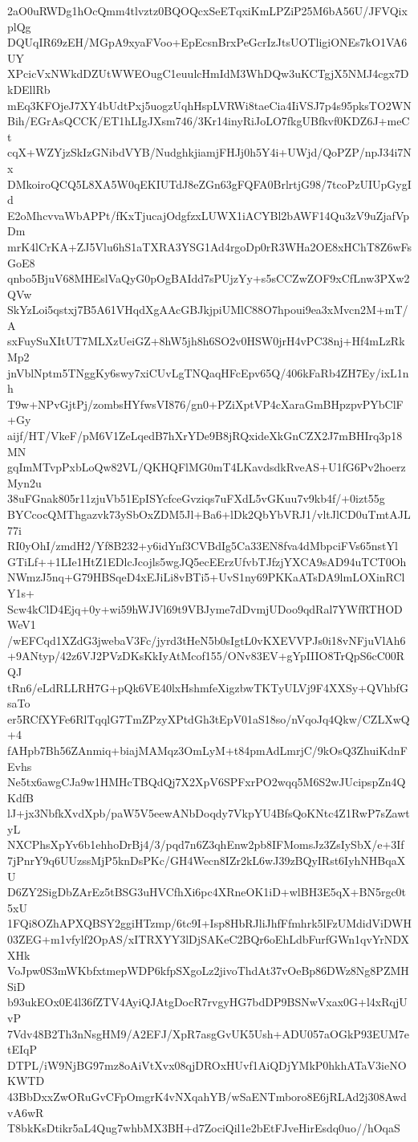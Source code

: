 2aO0uRWDg1hOcQmm4tlvztz0BQOQcxSeETqxiKmLPZiP25M6bA56U/JFVQixplQg
DQUqIR69zEH/MGpA9xyaFVoo+EpEcsnBrxPeGcrIzJtsUOTligiONEs7kO1VA6UY
XPcicVxNWkdDZUtWWEOugC1euulcHmIdM3WhDQw3uKCTgjX5NMJ4cgx7DkDEllRb
mEq3KFOjeJ7XY4bUdtPxj5uogzUqhHspLVRWi8taeCia4IiVSJ7p4s95pksTO2WN
Bih/EGrAsQCCK/ET1hLIgJXsm746/3Kr14inyRiJoLO7fkgUBfkvf0KDZ6J+meCt
cqX+WZYjzSkIzGNibdVYB/NudghkjiamjFHJj0h5Y4i+UWjd/QoPZP/npJ34i7Nx
DMkoiroQCQ5L8XA5W0qEKIUTdJ8eZGn63gFQFA0BrlrtjG98/7tcoPzUIUpGygId
E2oMhcvvaWbAPPt/fKxTjucajOdgfzxLUWX1iACYBl2bAWF14Qu3zV9uZjafVpDm
mrK4lCrKA+ZJ5Vlu6hS1aTXRA3YSG1Ad4rgoDp0rR3WHa2OE8xHChT8Z6wFsGoE8
qnbo5BjuV68MHEslVaQyG0pOgBAIdd7sPUjzYy+s5sCCZwZOF9xCfLnw3PXw2QVw
SkYzLoi5qstxj7B5A61VHqdXgAAcGBJkjpiUMlC88O7hpoui9ea3xMvcn2M+mT/A
sxFuySuXItUT7MLXzUeiGZ+8hW5jh8h6SO2v0HSW0jrH4vPC38nj+Hf4mLzRkMp2
jnVblNptm5TNggKy6swy7xiCUvLgTNQaqHFcEpv65Q/406kFaRb4ZH7Ey/ixL1nh
T9w+NPvGjtPj/zombsHYfwsVI876/gn0+PZiXptVP4cXaraGmBHpzpvPYbClF+Gy
aijf/HT/VkeF/pM6V1ZeLqedB7hXrYDe9B8jRQxideXkGnCZX2J7mBHIrq3p18MN
gqImMTvpPxbLoQw82VL/QKHQFlMG0mT4LKavdsdkRveAS+U1fG6Pv2hoerzMyn2u
38uFGnak805r11zjuVb51EpISYcfceGvziqs7uFXdL5vGKuu7v9kb4f/+0izt55g
BYCcocQMThgazvk73ySbOxZDM5Jl+Ba6+lDk2QbYbVRJ1/vltJlCD0uTmtAJL77i
RI0yOhI/zmdH2/Yf8B232+y6idYnf3CVBdIg5Ca33EN8fva4dMbpciFVs65nstYl
GTiLf++1LIe1HtZ1EDlcJcojls5wgJQ5ecEErzUfvbTJfzjYXCA9sAD94uTCT0Oh
NWmzJ5nq+G79HBSqeD4xEJiLi8vBTi5+UvS1ny69PKKaATsDA9lmLOXinRClY1s+
Scw4kClD4Ejq+0y+wi59hWJVl69t9VBJyme7dDvmjUDoo9qdRal7YWfRTHODWeV1
/wEFCqd1XZdG3jwebaV3Fc/jyrd3tHeN5b0sIgtL0vKXEVVPJs0i18vNFjuVlAh6
+9ANtyp/42z6VJ2PVzDKsKkIyAtMcof155/ONv83EV+gYpIIIO8TrQpS6cC00RQJ
tRn6/eLdRLLRH7G+pQk6VE40lxHshmfeXigzbwTKTyULVj9F4XXSy+QVhbfGsaTo
er5RCfXYFe6RlTqqlG7TmZPzyXPtdGh3tEpV01aS18so/nVqoJq4Qkw/CZLXwQ+4
fAHpb7Bh56ZAnmiq+biajMAMqz3OmLyM+t84pmAdLmrjC/9kOsQ3ZhuiKdnFEvhs
Ne5tx6awgCJa9w1HMHcTBQdQj7X2XpV6SPFxrPO2wqq5M6S2wJUcipspZn4QKdfB
lJ+jx3NbfkXvdXpb/paW5V5eewANbDoqdy7VkpYU4BfsQoKNtc4Z1RwP7sZawtyL
NXCPhsXpYv6b1ehhoDrBj4/3/pqd7n6Z3qhEnw2pb8IFMomsJz3ZsIySbX/e+3If
7jPnrY9q6UUzssMjP5knDsPKc/GH4Wecn8IZr2kL6wJ39zBQyIRst6IyhNHBqaXU
D6ZY2SigDbZArEz5tBSG3uHVCfhXi6pc4XRneOK1iD+wlBH3E5qX+BN5rgc0t5xU
1FQi8OZhAPXQBSY2ggiHTzmp/6tc9I+Isp8HbRJliJhfFfmhrk5lFzUMdidViDWH
03ZEG+m1vfylf2OpAS/xITRXYY3lDjSAKeC2BQr6oEhLdbFurfGWn1qvYrNDXXHk
VoJpw0S3mWKbfxtmepWDP6kfpSXgoLz2jivoThdAt37vOeBp86DWz8Ng8PZMHSiD
b93ukEOx0E4l36fZTV4AyiQJAtgDocR7rvgyHG7bdDP9BSNwVxax0G+l4xRqjUvP
7Vdv48B2Th3nNsgHM9/A2EFJ/XpR7asgGvUK5Ush+ADU057aOGkP93EUM7etEIqP
DTPL/iW9NjBG97mz8oAiVtXvx08qjDROxHUvf1AiQDjYMkP0hkhATaV3ieNOKWTD
43BbDxxZwORuGvCFpOmgrK4vNXqahYB/wSaENTmboro8E6jRLAd2j308AwdvA6wR
T8bkKsDtikr5aL4Qug7whbMX3BH+d7ZociQil1e2bEtFJveHirEsdq0uo//hOqaS
